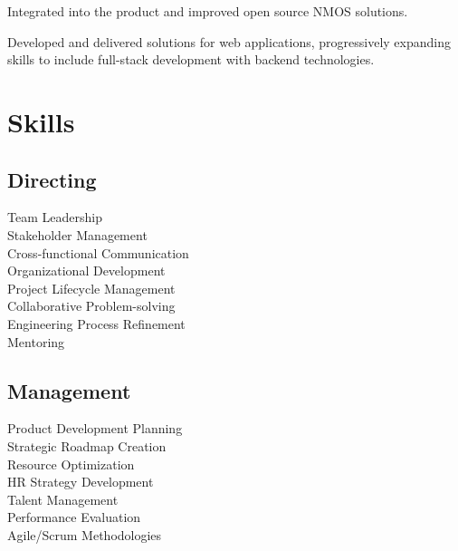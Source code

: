 \documentclass[]{external}
\begin{document}
\begin{paracol}{2}
    \begin{tightemize}
        \item Integrated into the product and improved open source NMOS solutions.
    \end{tightemize}
    \sectionsep

    \begin{tightemize}
        \item Developed and delivered solutions for web applications, progressively expanding skills to include full-stack development with backend technologies.
    \end{tightemize}
    \sectionsep
\switchcolumn[1]

    
    \section{Skills}
    \subsection{Directing}
    \vspace{\topsep}
    \setlength{\hangingindent}{3mm}
    \textbullet{} Team Leadership \\
    \textbullet{} Stakeholder Management \\
    \textbullet{} Cross-functional Communication \\
    \textbullet{} Organizational Development \\
    \textbullet{} Project Lifecycle Management \\
    \textbullet{} Collaborative Problem-solving \\
    \textbullet{} Engineering Process Refinement \\
    \textbullet{} Mentoring
    \sectionsep
    
    \subsection{Management}
    \vspace{\topsep}
    \textbullet{} Product Development Planning \\
    \textbullet{} Strategic Roadmap Creation \\
    \textbullet{} Resource Optimization \\
    \textbullet{} HR Strategy Development \\
    \textbullet{} Talent Management \\
    \textbullet{} Performance Evaluation \\
    \textbullet{} Agile/Scrum Methodologies
    \sectionsep
    

\end{paracol}
\end{document}
